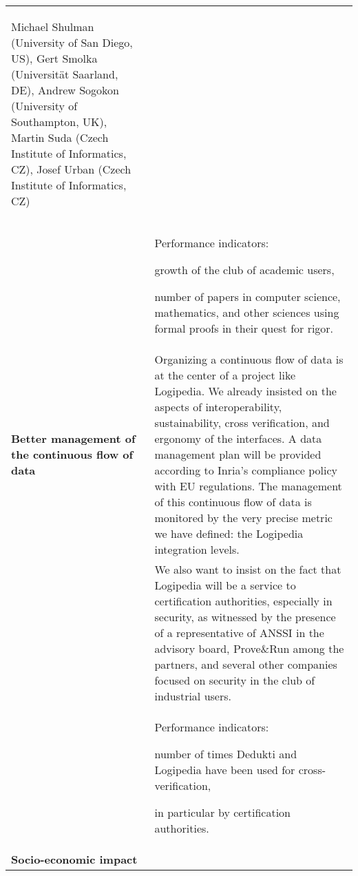 \begin{longtable}{|p{}|p{}|}
\begin{framed}
Michael Shulman (University of San Diego, US),
Gert Smolka (Universität Saarland, DE),
Andrew Sogokon (University of Southampton, UK),
Martin Suda (Czech Institute of Informatics, CZ),
Josef Urban (Czech Institute of Informatics, CZ)
\end{framed}
\\
&
\begin{framed}
Performance indicators:
\begin{compactitem}
\item growth of the club of academic users, 
\item number of papers in computer science, mathematics, and other sciences
using formal proofs in their quest for rigor.
\end{compactitem}
\end{framed}
\\
\hline
{\bf Better management of the continuous flow of data}
&
Organizing a continuous flow of data is at the center of a project
like Logipedia. We already insisted on the aspects of interoperability,
sustainability, cross verification, and ergonomy of the interfaces. 
A data management plan will be provided according to Inria's compliance
policy with EU regulations.
The management of this continuous flow of data is monitored by the 
very precise metric we have defined: the Logipedia integration levels.
\\
&
\hspace{0.4cm}
We also want to insist on the fact that Logipedia will be a service to
certification authorities, especially in security, as witnessed by the
presence of a representative of ANSSI in the advisory board,
Prove\&Run among the partners, and several other companies focused on
security in the club of industrial users.\\
&
\begin{framed}
Performance indicators: 
\begin{compactitem}
\item number of times Dedukti and Logipedia have been used for 
cross-verification, 
\item in particular by certification authorities. 
\end{compactitem}
\end{framed}
\\
\hline
{\bf Socio-economic impact}

\end{longtable}
